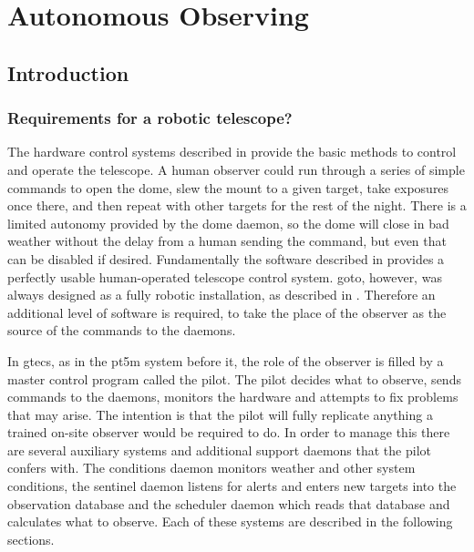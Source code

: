 \chapter{Autonomous Observing}
\label{chap:autonomous}
\chaptoc{}


\newpage
\section{Introduction}
\label{sec:autonomous_intro}
\begin{colsection}


\begin{colsection}


\end{colsection}


\subsection{Requirements for a robotic telescope?}
\label{sec:robot_requiremnets}
\begin{colsection}

The hardware control systems described in  provide the basic methods to control and operate the telescope. A human observer could run through a series of simple commands to open the dome, slew the mount to a given target, take exposures once there, and then repeat with other targets for the rest of the night. There is a limited autonomy provided by the dome daemon, so the dome will close in bad weather without the delay from a human sending the command, but even that can be disabled if desired. Fundamentally the software described in  provides a perfectly usable human-operated telescope control system. \gls{goto}, however, was always designed as a fully robotic installation, as described in . Therefore an additional level of software is required, to take the place of the observer as the source of the commands to the daemons.

In \gls{gtecs}, as in the \gls{pt5m} system before it, the role of the observer is filled by a master control program called the pilot. The pilot decides what to observe, sends commands to the daemons, monitors the hardware and attempts to fix problems that may arise. The intention is that the pilot will fully replicate anything a trained on-site observer would be required to do. In order to manage this there are several auxiliary systems and additional support daemons that the pilot confers with. The conditions daemon monitors weather and other system conditions, the sentinel daemon listens for alerts and enters new targets into the observation database and the scheduler daemon which reads that database and calculates what to observe. Each of these systems are described in the following sections.


\end{colsection}
\end{colsection}
